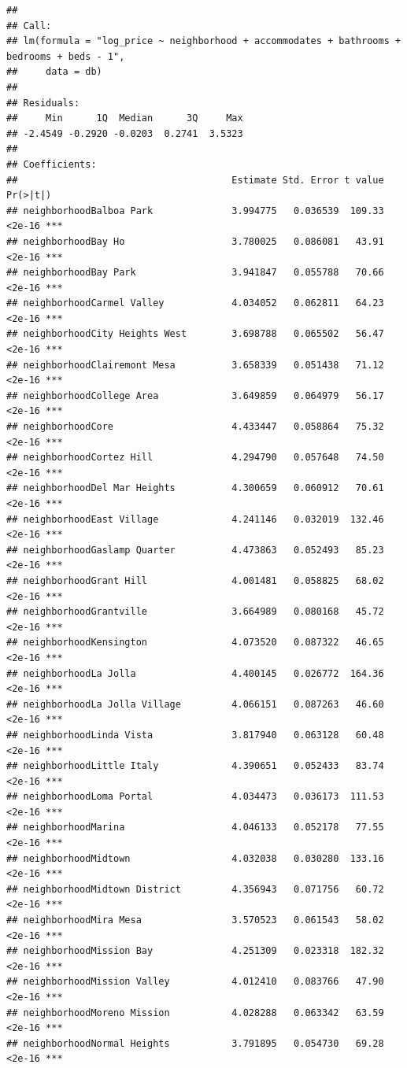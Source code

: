 \documentclass[
]{book}
\begin{document}
\begin{verbatim}
## 
## Call:
## lm(formula = "log_price ~ neighborhood + accommodates + bathrooms + bedrooms + beds - 1", 
##     data = db)
## 
## Residuals:
##     Min      1Q  Median      3Q     Max 
## -2.4549 -0.2920 -0.0203  0.2741  3.5323 
## 
## Coefficients:
##                                      Estimate Std. Error t value Pr(>|t|)    
## neighborhoodBalboa Park              3.994775   0.036539  109.33   <2e-16 ***
## neighborhoodBay Ho                   3.780025   0.086081   43.91   <2e-16 ***
## neighborhoodBay Park                 3.941847   0.055788   70.66   <2e-16 ***
## neighborhoodCarmel Valley            4.034052   0.062811   64.23   <2e-16 ***
## neighborhoodCity Heights West        3.698788   0.065502   56.47   <2e-16 ***
## neighborhoodClairemont Mesa          3.658339   0.051438   71.12   <2e-16 ***
## neighborhoodCollege Area             3.649859   0.064979   56.17   <2e-16 ***
## neighborhoodCore                     4.433447   0.058864   75.32   <2e-16 ***
## neighborhoodCortez Hill              4.294790   0.057648   74.50   <2e-16 ***
## neighborhoodDel Mar Heights          4.300659   0.060912   70.61   <2e-16 ***
## neighborhoodEast Village             4.241146   0.032019  132.46   <2e-16 ***
## neighborhoodGaslamp Quarter          4.473863   0.052493   85.23   <2e-16 ***
## neighborhoodGrant Hill               4.001481   0.058825   68.02   <2e-16 ***
## neighborhoodGrantville               3.664989   0.080168   45.72   <2e-16 ***
## neighborhoodKensington               4.073520   0.087322   46.65   <2e-16 ***
## neighborhoodLa Jolla                 4.400145   0.026772  164.36   <2e-16 ***
## neighborhoodLa Jolla Village         4.066151   0.087263   46.60   <2e-16 ***
## neighborhoodLinda Vista              3.817940   0.063128   60.48   <2e-16 ***
## neighborhoodLittle Italy             4.390651   0.052433   83.74   <2e-16 ***
## neighborhoodLoma Portal              4.034473   0.036173  111.53   <2e-16 ***
## neighborhoodMarina                   4.046133   0.052178   77.55   <2e-16 ***
## neighborhoodMidtown                  4.032038   0.030280  133.16   <2e-16 ***
## neighborhoodMidtown District         4.356943   0.071756   60.72   <2e-16 ***
## neighborhoodMira Mesa                3.570523   0.061543   58.02   <2e-16 ***
## neighborhoodMission Bay              4.251309   0.023318  182.32   <2e-16 ***
## neighborhoodMission Valley           4.012410   0.083766   47.90   <2e-16 ***
## neighborhoodMoreno Mission           4.028288   0.063342   63.59   <2e-16 ***
## neighborhoodNormal Heights           3.791895   0.054730   69.28   <2e-16 ***

\end{verbatim}
\end{document}
